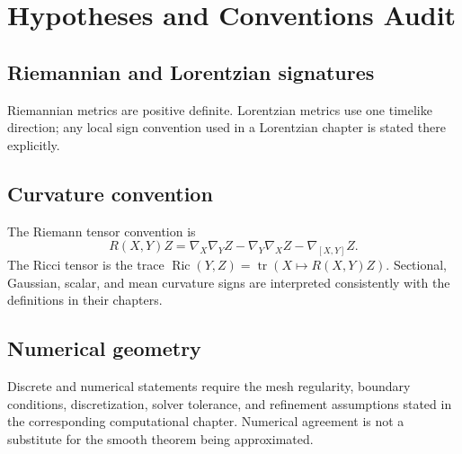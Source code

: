 \chapter*{Hypotheses and Conventions Audit}
{}

\section*{Riemannian and Lorentzian signatures}
Riemannian metrics are positive definite.  Lorentzian metrics use one timelike
direction; any local sign convention used in a Lorentzian chapter is stated
there explicitly.

\section*{Curvature convention}
The Riemann tensor convention is
\[
R(X,Y)Z=\nabla_X\nabla_Y Z-\nabla_Y\nabla_X Z-\nabla_{[X,Y]}Z.
\]
The Ricci tensor is the trace \( \operatorname{Ric}(Y,Z)=
\operatorname{tr}(X\mapsto R(X,Y)Z)\).  Sectional, Gaussian, scalar, and mean
curvature signs are interpreted consistently with the definitions in their
chapters.

\section*{Numerical geometry}
Discrete and numerical statements require the mesh regularity, boundary
conditions, discretization, solver tolerance, and refinement assumptions stated
in the corresponding computational chapter.  Numerical agreement is not a
substitute for the smooth theorem being approximated.
